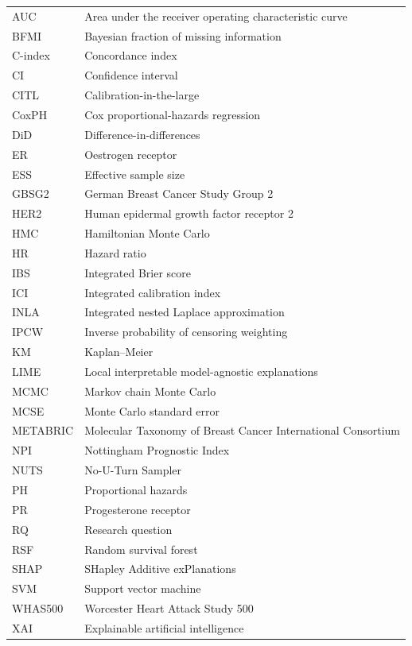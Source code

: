 \begingroup\small\singlespacing
\setlength{\LTleft}{0pt}\setlength{\LTright}{\fill}
\begin{longtable}{@{}>{\raggedright\arraybackslash}p{}>{\raggedright\arraybackslash}p{}@{}}
AUC & Area under the receiver operating characteristic curve \\
BFMI & Bayesian fraction of missing information \\
C-index & Concordance index \\
CI & Confidence interval \\
CITL & Calibration-in-the-large \\
CoxPH & Cox proportional-hazards regression \\
DiD & Difference-in-differences \\
ER & Oestrogen receptor \\
ESS & Effective sample size \\
GBSG2 & German Breast Cancer Study Group 2 \\
HER2 & Human epidermal growth factor receptor 2 \\
HMC & Hamiltonian Monte Carlo \\
HR & Hazard ratio \\
IBS & Integrated Brier score \\
ICI & Integrated calibration index \\
INLA & Integrated nested Laplace approximation \\
IPCW & Inverse probability of censoring weighting \\
KM & Kaplan--Meier \\
LIME & Local interpretable model-agnostic explanations \\
MCMC & Markov chain Monte Carlo \\
MCSE & Monte Carlo standard error \\
METABRIC & Molecular Taxonomy of Breast Cancer International Consortium \\
NPI & Nottingham Prognostic Index \\
NUTS & No-U-Turn Sampler \\
PH & Proportional hazards \\
PR & Progesterone receptor \\
RQ & Research question \\
RSF & Random survival forest \\
SHAP & SHapley Additive exPlanations \\
SVM & Support vector machine \\
WHAS500 & Worcester Heart Attack Study 500 \\
XAI & Explainable artificial intelligence \\
\end{longtable}
\endgroup
